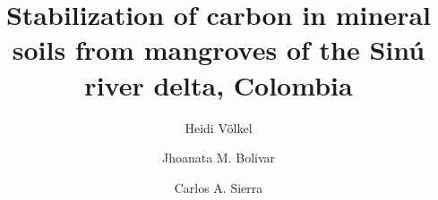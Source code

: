 %
%
%
%
%
%
\documentclass[smallextended, referee]{svjour3}       %
%
\smartqed  %
%
\usepackage{graphicx}
\usepackage{here}
\usepackage{upgreek}
\usepackage{wasysym}
\usepackage{natbib}
\usepackage{lineno}
\usepackage{url}
%
%
%
%
%


\title{Stabilization of carbon in mineral soils from mangroves of the Sin\'{u} river delta, Colombia%
}


\author{Heidi V\"olkel         \and
        Jhoanata M. Bolivar  \and Carlos A. Sierra
}

